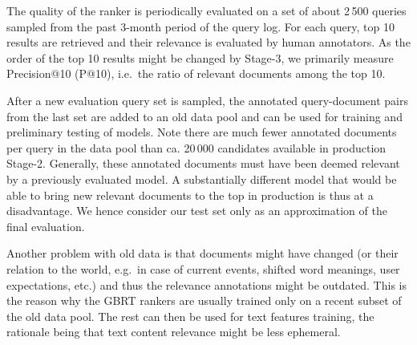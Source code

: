 \documentclass[letterpaper]{article} \usepackage{aaai22 }  \usepackage{times}  \usepackage{helvet}  \usepackage{courier}  \usepackage[hyphens]{url}  \usepackage{graphicx} \usepackage{amsmath,amsfonts,amssymb, mathabx,bm,bbm}
\begin{document}
The quality of the ranker is periodically evaluated on a set of about 2\,500 queries sampled from the past 3-month period of the query log. For each query, top 10 results are retrieved and their relevance is evaluated by human annotators. As the order of the top 10 results might be changed by Stage-3, we primarily measure Precision@10 (P@10), i.e.\ the ratio of relevant documents among the top 10.

After a new evaluation query set is sampled, the annotated query-document pairs from the last set are added to an old data pool and can be used for training and preliminary testing of models. Note there are much fewer annotated documents per query in the data pool than ca. 20\,000 candidates available in production Stage-2. Generally, these annotated documents must have been deemed relevant by a previously evaluated model. A substantially different model that would be able to bring new relevant documents to the top in production is thus at a disadvantage. We hence consider our test set only as an approximation of the final evaluation.

Another problem with old data is that documents might have changed (or their relation to the world, e.g.\ in case of current events, shifted word meanings, user expectations, etc.) and thus the relevance annotations might be outdated. This is the reason why the GBRT rankers are usually trained only on a recent subset of the old data pool. The rest can then be used for text features training, the rationale being that text content relevance might be less ephemeral.
\end{document}
